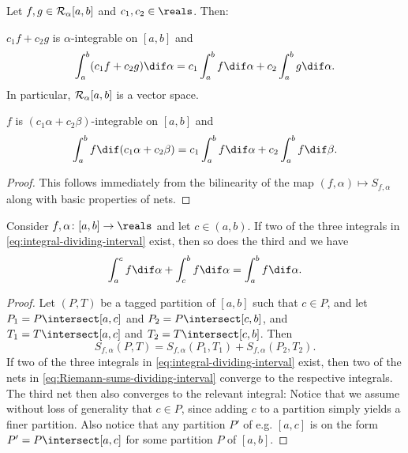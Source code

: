 \documentclass[article, a4paper, 11pt, oneside]{memoir}
\numberwithin{equation}{chapter}
\begin{document}
\begin{proposition}
    \label{prop:integral-linearity}
    Let $f,g \in \integrable[\alpha]{a,b}$ and $c_1, c_2 \in \reals$. Then:
    \begin{enumprop}
        \item $c_1 f + c_2 g$ is $\alpha$-integrable on $[a,b]$ and
        \begin{equation*}
            \int_a^b (c_1 f + c_2 g) \dif\alpha
                = c_1 \int_a^b f \dif\alpha + c_2 \int_a^b g \dif\alpha.
        \end{equation*}
        In particular, $\integrable[\alpha]{a,b}$ is a vector space.

        \item $f$ is $(c_1 \alpha + c_2 \beta)$-integrable on $[a,b]$ and
        \begin{equation*}
            \int_a^b f \dif(c_1 \alpha + c_2 \beta)
                = c_1 \int_a^b f \dif\alpha + c_2 \int_a^b f \dif\beta.
        \end{equation*}
    \end{enumprop}
\end{proposition}

\begin{proof}
    This follows immediately from the bilinearity of the map $(f,\alpha) \mapsto S_{f,\alpha}$ along with basic properties of nets.
\end{proof}


\begin{proposition}
    \label{prop:integral-dividing-interval}
    Consider $f, \alpha \colon [a,b] \to \reals$ and let $c \in (a,b)$. If two of the three integrals in \cref{eq:integral-dividing-interval} exist, then so does the third and we have
    \begin{equation}
        \label{eq:integral-dividing-interval}
        \int_a^c f \dif\alpha + \int_c^b f \dif\alpha
            = \int_a^b f \dif\alpha.
    \end{equation}
\end{proposition}

\begin{proof}
    Let $(P,T)$ be a tagged partition of $[a,b]$ such that $c \in P$, and let $P_1 = P \intersect [a,c]$ and $P_2 = P \intersect [c,b]$, and $T_1 = T \intersect [a,c]$ and $T_2 = T \intersect [c,b]$. Then
    \begin{equation}
        \label{eq:Riemann-sums-dividing-interval}
        S_{f,\alpha}(P,T)
            = S_{f,\alpha}(P_1,T_1) + S_{f,\alpha}(P_2,T_2).
    \end{equation}
    If two of the three integrals in \cref{eq:integral-dividing-interval} exist, then two of the nets in \cref{eq:Riemann-sums-dividing-interval} converge to the respective integrals. The third net then also converges to the relevant integral: Notice that we assume without loss of generality that $c \in P$, since adding $c$ to a partition simply yields a finer partition. Also notice that any partition $P'$ of e.g. $[a,c]$ is on the form $P' = P \intersect [a,c]$ for some partition $P$ of $[a,b]$.
\end{proof}
\end{document}

